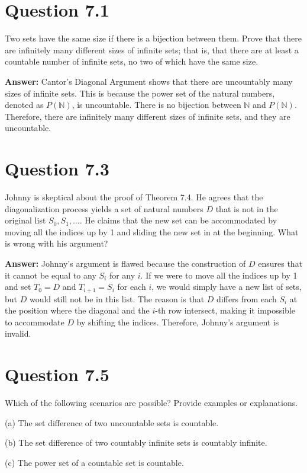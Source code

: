 \documentclass{article}
\begin{document}
\section*{Question 7.1}
Two sets have the same size if there is a bijection between them. Prove that there are infinitely many different sizes of infinite sets; that is, that there are at least a countable number of infinite sets, no two of which have the same size.

\textbf{Answer:} Cantor's Diagonal Argument shows that there are uncountably many sizes of infinite sets. This is because the power set of the natural numbers, denoted as $P(\mathbb{N})$, is uncountable. There is no bijection between $\mathbb{N}$ and $P(\mathbb{N})$. Therefore, there are infinitely many different sizes of infinite sets, and they are uncountable.

\section*{Question 7.3}
Johnny is skeptical about the proof of Theorem 7.4. He agrees that the diagonalization process yields a set of natural numbers $D$ that is not in the original list $S_0, S_1, \ldots$. He claims that the new set can be accommodated by moving all the indices up by 1 and sliding the new set in at the beginning. What is wrong with his argument?

\textbf{Answer:} Johnny's argument is flawed because the construction of $D$ ensures that it cannot be equal to any $S_i$ for any $i$. If we were to move all the indices up by 1 and set $T_0 = D$ and $T_{i+1} = S_i$ for each $i$, we would simply have a new list of sets, but $D$ would still not be in this list. The reason is that $D$ differs from each $S_i$ at the position where the diagonal and the $i$-th row intersect, making it impossible to accommodate $D$ by shifting the indices. Therefore, Johnny's argument is invalid.

\section*{Question 7.5}
Which of the following scenarios are possible? Provide examples or explanations.

(a) The set difference of two uncountable sets is countable.

(b) The set difference of two countably infinite sets is countably infinite.

(c) The power set of a countable set is countable.
\end{document}
